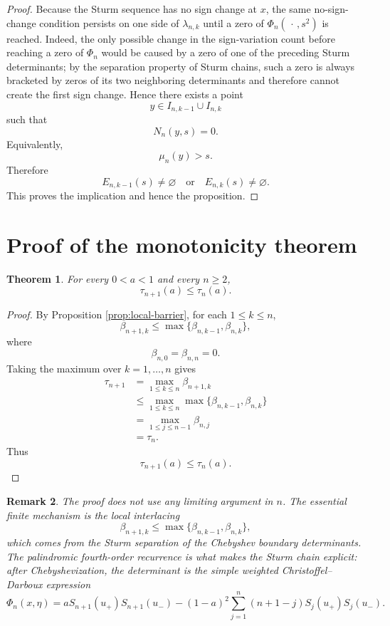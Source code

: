 \documentclass[11pt]{amsart}
\numberwithin{equation}{section}
\newtheorem{theorem}{Theorem}[section]
\newtheorem{remark}[theorem]{Remark}
\begin{document}
\begin{proof}
Because the Sturm sequence has no sign change at \(x\), the same no-sign-change
condition persists on one side of \(\lambda_{n,k}\) until a zero of
\(\Phi_n(\,\cdot\,,s^2)\) is reached.  Indeed, the only possible change in
the sign-variation count before reaching a zero of \(\Phi_n\) would be
caused by a zero of one of the preceding Sturm determinants; by the
separation property of Sturm chains, such a zero is always bracketed by
zeros of its two neighboring determinants and therefore cannot create the
first sign change.  Hence there exists a point
\[
        y\in I_{n,k-1}\cup I_{n,k}
\]
such that
\[
        N_n(y,s)=0.
\]
Equivalently,
\[
        \mu_n(y)>s.
\]
Therefore
\[
        E_{n,k-1}(s)\neq\varnothing
        \quad\text{or}\quad
        E_{n,k}(s)\neq\varnothing.
\]
This proves the implication and hence the proposition.
\end{proof}

\section{Proof of the monotonicity theorem}

\begin{theorem}\label{thm:main}
For every \(0<a<1\) and every \(n\ge2\),
\[
        \tau_{n+1}(a)\le \tau_n(a).
\]
\end{theorem}

\begin{proof}
By Proposition \ref{prop:local-barrier}, for each \(1\le k\le n\),
\[
        \beta_{n+1,k}
        \le
        \max\{\beta_{n,k-1},\beta_{n,k}\},
\]
where
\[
        \beta_{n,0}=\beta_{n,n}=0.
\]
Taking the maximum over \(k=1,\dots,n\) gives
\[
\begin{aligned}
        \tau_{n+1}
        &=
        \max_{1\le k\le n}\beta_{n+1,k}                                      \\
        &\le
        \max_{1\le k\le n}
        \max\{\beta_{n,k-1},\beta_{n,k}\}                                    \\
        &=
        \max_{1\le j\le n-1}\beta_{n,j}                                      \\
        &=
        \tau_n.
\end{aligned}
\]
Thus
\[
        \tau_{n+1}(a)\le\tau_n(a).
\]
\end{proof}

\begin{remark}
The proof does not use any limiting argument in \(n\).  The essential finite
mechanism is the local interlacing
\[
        \beta_{n+1,k}
        \le
        \max\{\beta_{n,k-1},\beta_{n,k}\},
\]
which comes from the Sturm separation of the Chebyshev boundary determinants.
The palindromic fourth-order recurrence is what makes the Sturm chain
explicit: after Chebyshevization, the determinant is the simple weighted
Christoffel--Darboux expression
\[
        \Phi_n(x,\eta)
        =
        aS_{n+1}(u_+)S_{n+1}(u_-)
        -
        (1-a)^2
        \sum_{j=1}^{n}(n+1-j)S_j(u_+)S_j(u_-).
\]
\end{remark}
\end{document}
